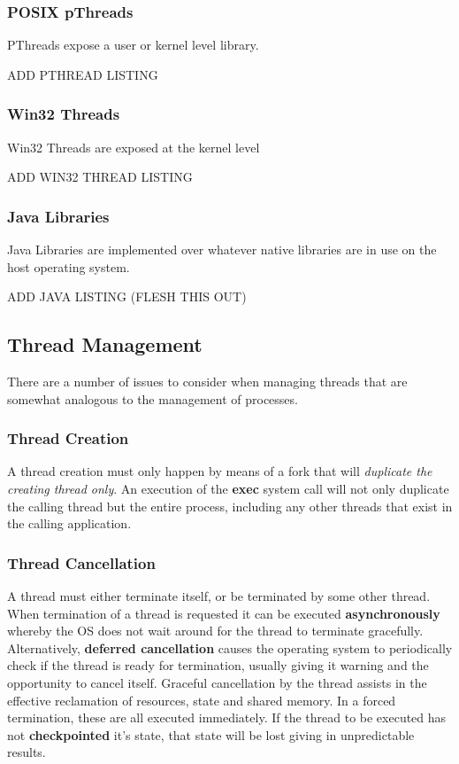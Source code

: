 \documentclass[10pt,a4paper]{article}
\begin{document}
\subsubsection{POSIX pThreads}
PThreads \cite{pthreads} expose a user or kernel level library. 

ADD PTHREAD LISTING

\subsubsection{Win32 Threads}
Win32 Threads \cite{win32threads} are exposed at the kernel level 

ADD WIN32 THREAD LISTING

\subsubsection{Java Libraries}
Java Libraries \cite{javathreads} are implemented over whatever native libraries are in use on the host operating system. 

ADD JAVA LISTING
\newline\newline (FLESH THIS OUT)

\subsection{Thread Management}
There are a number of issues to consider when managing threads that are somewhat analogous to the management of processes. 
\subsubsection{Thread Creation}
A thread creation  must only happen by means of a fork that will {\it duplicate the creating thread only}. An execution of the {\bf exec} system call will not only duplicate the calling thread but the entire process, including any other threads that exist in the calling application. 
\subsubsection{Thread Cancellation}
A thread must either terminate itself, or be terminated by some other thread. When termination of a thread is requested it can be executed {\bf asynchronously} whereby the OS does not wait around for the thread to terminate gracefully. Alternatively, {\bf deferred cancellation} causes the operating system to periodically check if the thread is ready for termination, usually giving it warning and the opportunity to cancel itself. Graceful cancellation by the thread assists in the effective reclamation of resources, state and shared memory. In a forced termination, these are all executed immediately. If the thread to be executed has not {\bf checkpointed} it's state, that state will be lost giving in unpredictable results.  
\end{document}
